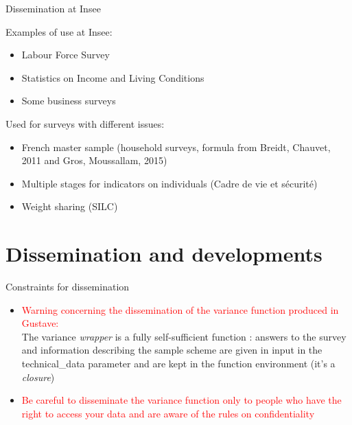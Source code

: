 \documentclass[xcolor=dvipsnames]{beamer}
\begin{document}
\begin{frame}{Dissemination at Insee}

Examples of use at Insee: 
    \vspace{0.2 cm}
    \begin{itemize}
        \item Labour Force Survey
        \vspace{0.1cm}
        \item Statistics on Income and Living Conditions
        \vspace{0.1cm}
        \item Some business surveys
    \end{itemize}


\vspace{0.4 cm}

Used for surveys with different issues: 
\vspace{0.2cm}
\begin{itemize}
    \item French master sample (household surveys, formula from Breidt, Chauvet, 2011 and Gros, Moussallam, 2015)
    \vspace{0.1cm}
    \item Multiple stages for indicators on individuals (Cadre de vie et sécurité)
    \vspace{0.1cm}
    \item Weight sharing (SILC)
\end{itemize}

\end{frame}


\section{Dissemination and developments}


\begin{frame}{Constraints for dissemination}

\begin{itemize}
    \item \textcolor{red}{Warning concerning the dissemination of the variance function produced in Gustave:} \\ \vspace{0.2 cm} The variance \textit{wrapper} is a fully self-sufficient function : answers to the survey and information describing the sample scheme are given in input in the technical\_data parameter and are  kept in the function environment (it's a \textit{closure})
    
    \vspace{0.5cm}

    \item \textcolor{red}{Be careful to disseminate the variance function only to people who have the right to access your data and are aware of the rules on confidentiality}
\end{itemize}

\end{frame}
\end{document}
